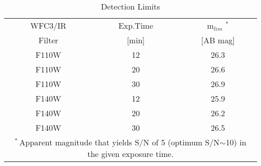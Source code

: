 
\begin{wraptable}{r}{2.25in}
 \caption{Detection Limits \label{tab:detectionLimits}}
 \begin{tabular}{ccc}
  \toprule
  \toprule
   WFC3/IR & Exp.Time & m$_{lim}$ $^{*}$ \\
   Filter  &  [min] &  [AB mag] \\
   \midrule
   F110W   &    12  &   26.3 \\
   F110W   &    20  &   26.6 \\
   F110W   &    30  &   26.9 \\
   F140W   &    12  &   25.9 \\
   F140W   &    20  &   26.2 \\ 
   F140W   &    30  &   26.5 \\
  \bottomrule
 \multicolumn{3}{p{2.6in}}{$^*$\,Apparent magnitude that yields S/N of 5 (optimum S/N$\sim$10) in the given exposure time.}
\end{tabular}
\end{wraptable}



